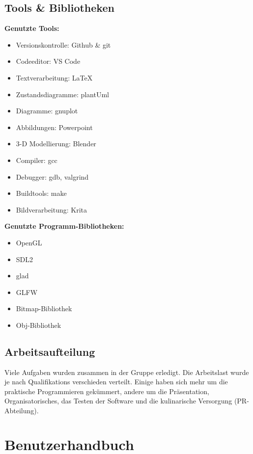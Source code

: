 \documentclass[11pt]{article}
\begin{document}
\subsection{Tools \& Bibliotheken}

\textbf{Genutzte Tools:}
\begin{itemize}
  \item Versionskontrolle: Github \& git
  \item Codeeditor: VS Code
  \item Textverarbeitung: \LaTeX
  \item Zustandsdiagramme: plantUml
  \item Diagramme: gnuplot
  \item Abbildungen: Powerpoint
  \item 3-D Modellierung: Blender
  \item Compiler: gcc
  \item Debugger: gdb, valgrind
  \item Buildtools: make
  \item Bildverarbeitung: Krita
\end{itemize}

\noindent \textbf{Genutzte Programm-Bibliotheken:}
\begin{itemize}
  \item OpenGL
  \item SDL2
  \item glad
  \item GLFW
  \item Bitmap-Bibliothek
  \item Obj-Bibliothek
\end{itemize}

\subsection{Arbeitsaufteilung}

Viele Aufgaben wurden zusammen in der Gruppe erledigt. 
Die Arbeitslast wurde je nach Qualifikations verschieden verteilt. 
Einige haben sich mehr um die praktische Programmieren gekümmert, andere um die Präsentation, Organisatorisches, das Testen der Software und die kulinarische Versorgung (PR-Abteilung).

\pagebreak

\section{Benutzerhandbuch}
\end{document}
